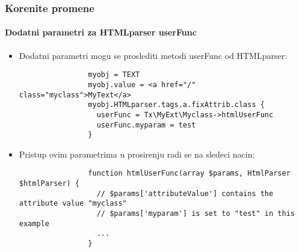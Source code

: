 \begin{frame}[fragile]
	\frametitle{Korenite promene}
	\framesubtitle{Dodatni parametri za HTMLparser userFunc}

	\lstset{basicstyle=\tiny\ttfamily}

	\begin{itemize}

		\item Dodatni parametri mogu se proslediti metodi userFunc od HTMLparser:

			\begin{lstlisting}
				myobj = TEXT
				myobj.value = <a href="/" class="myclass">MyText</a>
				myobj.HTMLparser.tags.a.fixAttrib.class {
				  userFunc = Tx\MyExt\Myclass->htmlUserFunc
				  userFunc.myparam = test
				}
			\end{lstlisting}

		\item Pristup ovim parametrima u prosirenju radi se na sledeci nacin:

			\begin{lstlisting}
				function htmlUserFunc(array $params, HtmlParser $htmlParser) {
				  // $params['attributeValue'] contains the attribute value "myclass"
				  // $params['myparam'] is set to "test" in this example
				  ...
				}
			\end{lstlisting}

	\end{itemize}

\end{frame}

